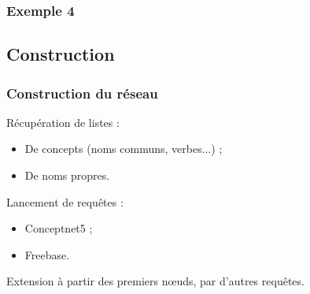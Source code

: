 \documentclass[12pt, handout]{beamer}
\begin{document}
\begin{frame}
 \frametitle{Exemple 4}
 
% 
%   

\end{frame}



\subsection{Construction}

\begin{frame}
 \frametitle{Construction du réseau}
 
 Récupération de listes :
 
 \begin{itemize}
  \item De concepts (noms communs, verbes...) ;
  \item De noms propres.
 \end{itemize}

 \pause
 
 Lancement de requêtes :
 \begin{itemize}
  \item Conceptnet5 ;
  \item Freebase.
 \end{itemize}
 
 \pause
 
 Extension à partir des premiers n\oe uds, par d'autres requêtes.
 
 
\end{frame}
\end{document}
